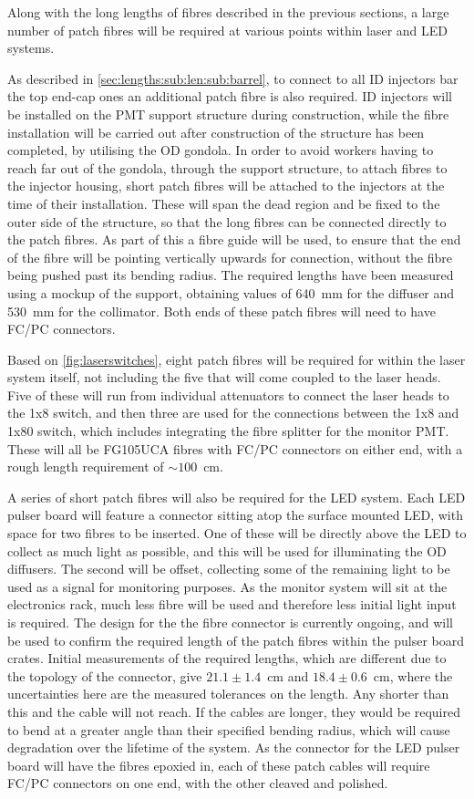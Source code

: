 \documentclass[a4paper,11pt]{article}
\let\oldsim\sim
\renewcommand{\sim}{{\oldsim}}
\begin{document}
Along with the long lengths of fibres described in the previous sections, a large number of patch fibres will be required at various points within laser and LED systems.

As described in \cref{sec:lengths:sub:len:sub:barrel}, to connect to all ID injectors bar the top end-cap ones an additional patch fibre is also required. ID injectors will be installed on the PMT support structure during construction, while the fibre installation will be carried out after construction of the structure has been completed, by utilising the OD gondola. In order to avoid workers having to reach far out of the gondola, through the support structure, to attach fibres to the injector housing, short patch fibres will be attached to the injectors at the time of their installation. These will span the dead region and be fixed to the outer side of the structure, so that the long fibres can be connected directly to the patch fibres. As part of this a fibre guide will be used, to ensure that the end of the fibre will be pointing vertically upwards for connection, without the fibre being pushed past its bending radius. The required lengths have been measured using a mockup of the support, obtaining values of 640~mm for the diffuser and 530~mm for the collimator. Both ends of these patch fibres will need to have FC/PC connectors.

Based on \cref{fig:laserswitches}, eight patch fibres will be required for within the laser system itself, not including the five that will come coupled to the laser heads. Five of these will run from individual attenuators to connect the laser heads to the 1x8 switch, and then three are used for the connections between the 1x8 and 1x80 switch, which includes integrating the fibre splitter for the monitor PMT. These will all be FG105UCA fibres with FC/PC connectors on either end, with a rough length requirement of $\sim100$~cm.

A series of short patch fibres will also be required for the LED system. Each LED pulser board will feature a connector sitting atop the surface mounted LED, with space for two fibres to be inserted. One of these will be directly above the LED to collect as much light as possible, and this will be used for illuminating the OD diffusers. The second will be offset, collecting some of the remaining light to be used as a signal for monitoring purposes. As the monitor system will sit at the electronics rack, much less fibre will be used and therefore less initial light input is required. The design for the the fibre connector is currently ongoing, and will be used to confirm the required length of the patch fibres within the pulser board crates. Initial measurements of the required lengths, which are different due to the topology of the connector, give $21.1\pm1.4$~cm and $18.4\pm0.6$~cm, where the uncertainties here are the measured tolerances on the length. Any shorter than this and the cable will not reach. If the cables are longer, they would be required to bend at a greater angle than their specified bending radius, which will cause degradation over the lifetime of the system. As the connector for the LED pulser board will have the fibres epoxied in, each of these patch cables will require FC/PC connectors on one end, with the other cleaved and polished.
\end{document}
